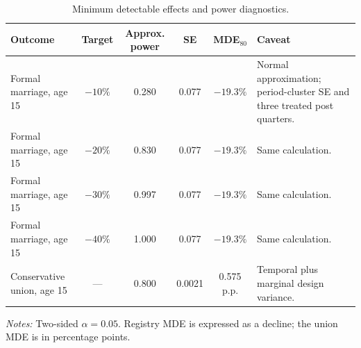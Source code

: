 \begin{table}[!htbp]
\centering
\caption{Minimum detectable effects and power diagnostics.}
\label{tab:power}
\begingroup\footnotesize
\begin{tabularx}{\linewidth}{@{}lcccc>{\raggedright\arraybackslash}X@{}}
\toprule
Outcome & Target & Approx. power & SE & MDE$_{80}$ & Caveat \\
\midrule
Formal marriage, age 15 & $-10\%$ & 0.280 & 0.077 & $-19.3\%$ & Normal approximation; period-cluster SE and three treated post quarters. \\
Formal marriage, age 15 & $-20\%$ & 0.830 & 0.077 & $-19.3\%$ & Same calculation. \\
Formal marriage, age 15 & $-30\%$ & 0.997 & 0.077 & $-19.3\%$ & Same calculation. \\
Formal marriage, age 15 & $-40\%$ & 1.000 & 0.077 & $-19.3\%$ & Same calculation. \\
Conservative union, age 15 & --- & 0.800 & 0.0021 & 0.575 p.p. & Temporal plus marginal design variance. \\
\bottomrule
\end{tabularx}
\par\smallskip
\footnotesize\emph{Notes:} Two-sided $\alpha=0.05$. Registry MDE is expressed as a
decline; the union MDE is in percentage points.
\endgroup
\end{table}
